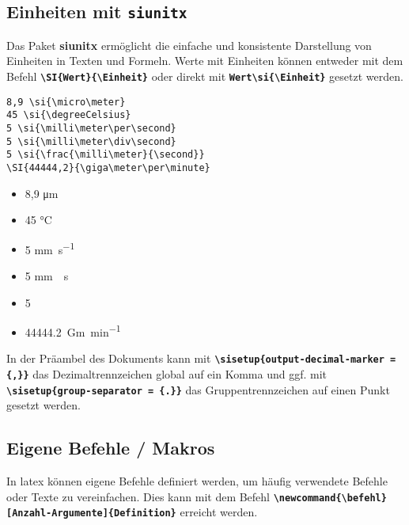 \subsection{Einheiten mit \texttt{siunitx}}

Das Paket \textbf{siunitx} ermöglicht die einfache und konsistente Darstellung von Einheiten in Texten und Formeln.
Werte mit Einheiten können entweder mit dem Befehl \textbf{\texttt{\textbackslash SI\{Wert\}\{\textbackslash Einheit\}}} oder direkt mit \textbf{\texttt{Wert\textbackslash si\{\textbackslash Einheit\}}} gesetzt werden.

\begin{minipage}[c]{0.6\textwidth}
    \begin{lstlisting}[language={[LaTeX]TeX}, lineskip=2pt]
8,9 \si{\micro\meter}               
45 \si{\degreeCelsius}              
5 \si{\milli\meter\per\second}      
5 \si{\milli\meter\div\second}      
5 \si{\frac{\milli\meter}{\second}} 
\SI{44444,2}{\giga\meter\per\minute}    
    \end{lstlisting}
\end{minipage}
\hfill
\begin{minipage}[c]{0.3\textwidth}
    \begin{itemize}[itemsep=2pt, label=$\rightarrow$]
        \item 8,9 \si{\micro\meter}
        \item 45 \si{\degreeCelsius}
        \item 5 \si{\milli\meter\per\second}
        \item 5 \si{\milli\meter\div\second}
        \item 5 \si{\frac{\milli\meter}{\second}}
        \item \SI{44444,2}{\giga\meter\per\minute}
    \end{itemize}
\end{minipage}

In der Präambel des Dokuments kann mit \texttt{\textbf{\textbackslash sisetup\{output-decimal-marker = \{,\}\}}} das Dezimaltrennzeichen global auf ein Komma und ggf. mit \textbf{\texttt{\textbackslash sisetup\{group-separator = \{.\}\}}} das Gruppentrennzeichen auf einen Punkt gesetzt werden.


\subsection{Eigene Befehle / Makros}
In latex können eigene Befehle definiert werden, um häufig verwendete Befehle oder Texte zu vereinfachen. Dies kann mit dem Befehl \textbf{\texttt{\textbackslash newcommand\{\textbackslash befehl\}[Anzahl-Argumente]\{Definition\}}} erreicht werden.


